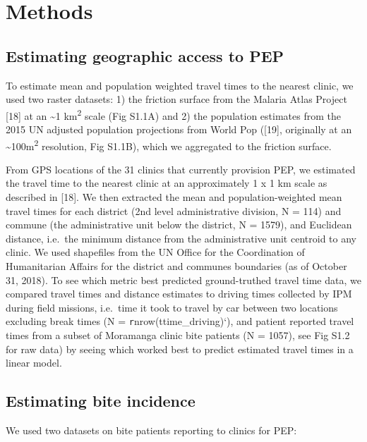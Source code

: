 \documentclass[
]{book}
\begin{document}
\hypertarget{methods-1}{%
\section{Methods}\label{methods-1}}

\hypertarget{estimating-geographic-access-to-pep}{%
\subsection{Estimating geographic access to PEP}\label{estimating-geographic-access-to-pep}}

To estimate mean and population weighted travel times to the nearest
clinic, we used two raster datasets: 1) the friction surface from the
Malaria Atlas Project {[}18{]} at an \textasciitilde1 km\textsuperscript{2} scale (Fig S1.1A) and 2)
the population estimates from the 2015 UN adjusted population
projections from World Pop ({[}19{]}, originally at an \textasciitilde100m\textsuperscript{2}
resolution, Fig S1.1B), which we aggregated to the friction surface.

From GPS locations of the 31 clinics that currently provision PEP, we
estimated the travel time to the nearest clinic at an approximately 1 x
1 km scale as described in {[}18{]}. We then extracted the mean and
population-weighted mean travel times for each district (2nd level
administrative division, N = 114) and commune (the administrative unit
below the district, N = 1579), and Euclidean distance, i.e.~the minimum
distance from the administrative unit centroid to any clinic. We used
shapefiles from the UN Office for the Coordination of Humanitarian
Affairs for the district and communes boundaries (as of October 31,
2018). To see which metric best predicted ground-truthed travel time
data, we compared travel times and distance estimates to driving times
collected by IPM during field missions, i.e.~time it took to travel by
car between two locations excluding break times (N =
\texttt{r}nrow(ttime\_driving)`), and patient reported travel times from a
subset of Moramanga clinic bite patients (N = 1057), see Fig S1.2 for
raw data) by seeing which worked best to predict estimated travel times
in a linear model.

\hypertarget{estimating-bite-incidence}{%
\subsection{Estimating bite incidence}\label{estimating-bite-incidence}}

We used two datasets on bite patients reporting to clinics for PEP:
\end{document}
